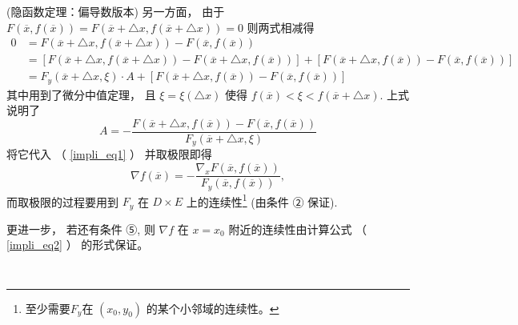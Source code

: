 \begin{theorem}{(隐函数定理：偏导数版本)}
另一方面， 由于 $F(\overline{x},f(\overline{x}))=F(\overline{x}+\triangle x,f(\overline{x}+\triangle x))=0$
则两式相减得
\begin{equation}
\begin{aligned}
0 & = F(\overline{x}+\triangle x,f(\overline{x}+\triangle x))-F(\overline{x},f(\overline{x}))\\
 & = \left[F(\overline{x}+\triangle x,f(\overline{x}+\triangle x))-F(\overline{x}+\triangle x,f(\overline{x}))\right]+\left[F(\overline{x}+\triangle x,f(\overline{x}))-F(\overline{x},f(\overline{x}))\right]\\
 & = F_{y}(\overline{x}+\triangle x,\xi)\cdot A+\left[F(\overline{x}+\triangle x,f(\overline{x}))-F(\overline{x},f(\overline{x}))\right]
\end{aligned}
\end{equation}
其中用到了微分中值定理， 且 $\xi=\xi(\triangle x)$ 使得 $f(\overline{x})<\xi<f(\overline{x}+\triangle x)$.
上式说明了 
\[
A=-{\displaystyle \frac{F(\overline{x}+\triangle x,f(\overline{x}))-F(\overline{x},f(\overline{x}))}{F_{y}(\overline{x}+\triangle x,\xi)}}
\]
将它代入 （ \autoref{impli_eq1} ） 并取极限即得 
\begin{equation}\label{impli_eq2}
\nabla f(\overline{x})=-{\displaystyle \frac{\nabla_{x}F(\overline{x},f(\overline{x}))}{F_{y}(\overline{x},f(\overline{x}))},}
\end{equation}
而取极限的过程要用到 $F_{y}$ 在 $D\times E$ 上的连续性\footnote{至少需要$F_y$在 $(x_0,y_0)$ 的某个小邻域的连续性。} (由条件 ② 保证). 

更进一步， 若还有条件 ⑤, 则 $\nabla f$ 在 $x=x_{0}$ 附近的连续性由计算公式 （ \autoref{impli_eq2} ） 的形式保证。 
 \end{theorem}

\verb| |

